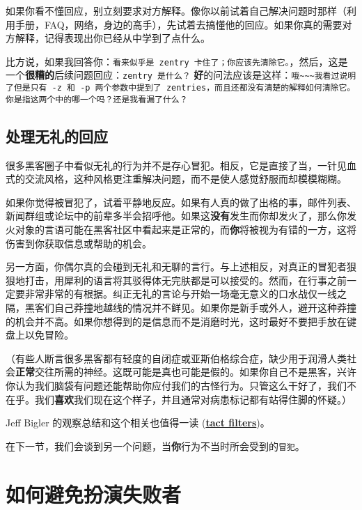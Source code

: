\documentclass[titlepage]{article}
\begin{document}
如果你看不懂回应，别立刻要求对方解释。像你以前试着自己解决问题时那样（利用手册，FAQ，网络，身边的高手），先试着去搞懂他的回应。如果你真的需要对方解释，记得表现出你已经从中学到了点什么。

比方说，如果我回答你：\texttt{看来似乎是\ zentry\ 卡住了；你应该先清除它。}，然后，这是一个\textbf{很糟的}后续问题回应：\texttt{zentry\ 是什么？}
\textbf{好}的问法应该是这样：\texttt{哦\textasciitilde{}\textasciitilde{}\textasciitilde{}我看过说明了但是只有\ -z\ 和\ -p\ 两个参数中提到了\ zentries，而且还都没有清楚的解释如何清除它。你是指这两个中的哪一个吗？还是我看漏了什么？}

\hypertarget{ux5904ux7406ux65e0ux793cux7684ux56deux5e94}{\subsection{处理无礼的回应}\label{ux5904ux7406ux65e0ux793cux7684ux56deux5e94}}

很多黑客圈子中看似无礼的行为并不是存心冒犯。相反，它是直接了当，一针见血式的交流风格，这种风格更注重解决问题，而不是使人感觉舒服而却模模糊糊。

如果你觉得被冒犯了，试着平静地反应。如果有人真的做了出格的事，邮件列表、新闻群组或论坛中的前辈多半会招呼他。如果这\textbf{没有}发生而你却发火了，那么你发火对象的言语可能在黑客社区中看起来是正常的，而\textbf{你}将被视为有错的一方，这将伤害到你获取信息或帮助的机会。

另一方面，你偶尔真的会碰到无礼和无聊的言行。与上述相反，对真正的冒犯者狠狠地打击，用犀利的语言将其驳得体无完肤都是可以接受的。然而，在行事之前一定要非常非常的有根据。纠正无礼的言论与开始一场毫无意义的口水战仅一线之隔，黑客们自己莽撞地越线的情况并不鲜见。如果你是新手或外人，避开这种莽撞的机会并不高。如果你想得到的是信息而不是消磨时光，这时最好不要把手放在键盘上以免冒险。

（有些人断言很多黑客都有轻度的自闭症或亚斯伯格综合症，缺少用于润滑人类社会\textbf{正常}交往所需的神经。这既可能是真也可能是假的。如果你自己不是黑客，兴许你认为我们脑袋有问题还能帮助你应付我们的古怪行为。只管这么干好了，我们不在乎。我们\textbf{喜欢}我们现在这个样子，并且通常对病患标记都有站得住脚的怀疑。）

Jeff Bigler 的观察总结和这个相关也值得一读
(\textbf{\href{http://www.mit.edu/~jcb/tact.html}{tact filters}})。

在下一节，我们会谈到另一个问题，当\textbf{你}行为不当时所会受到的\texttt{冒犯}。

\hypertarget{ux5982ux4f55ux907fux514dux626eux6f14ux5931ux8d25ux8005}{\section{如何避免扮演失败者}\label{ux5982ux4f55ux907fux514dux626eux6f14ux5931ux8d25ux8005}}
\end{document}
